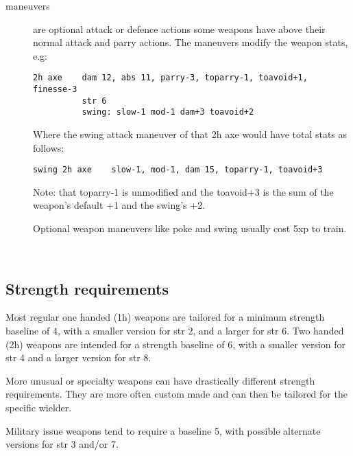 \begin{description}
\item[maneuvers] are optional attack or defence actions some weapons have above their normal attack and parry actions. The maneuvers modify the weapon stats, e.g:
\begin{verbatim}
2h axe    dam 12, abs 11, parry-3, toparry-1, toavoid+1, finesse-3
          str 6
          swing: slow-1 mod-1 dam+3 toavoid+2
\end{verbatim}
Where the swing attack maneuver of that 2h axe would have total stats as follows:
\begin{verbatim}
swing 2h axe    slow-1, mod-1, dam 15, toparry-1, toavoid+3
\end{verbatim}
Note: that toparry-1 is unmodified and the toavoid+3 is the sum of the weapon's default +1 and the swing's +2.

Optional weapon maneuvers like poke and swing usually cost 5xp to train.

\end{description}

\

\subsection*{Strength requirements}
Most regular one handed (1h) weapons are tailored for a minimum strength baseline of 4, with a smaller version for str 2, and a larger for str 6. Two handed (2h) weapons are intended for a strength baseline of 6, with a smaller version for str 4 and a larger version for str 8.

More unusual or specialty weapons can have drastically different strength requirements. They are more often custom made and can then be tailored for the specific wielder.

Military issue weapons tend to require a baseline 5, with possible alternate versions for str 3 and/or 7.




%




